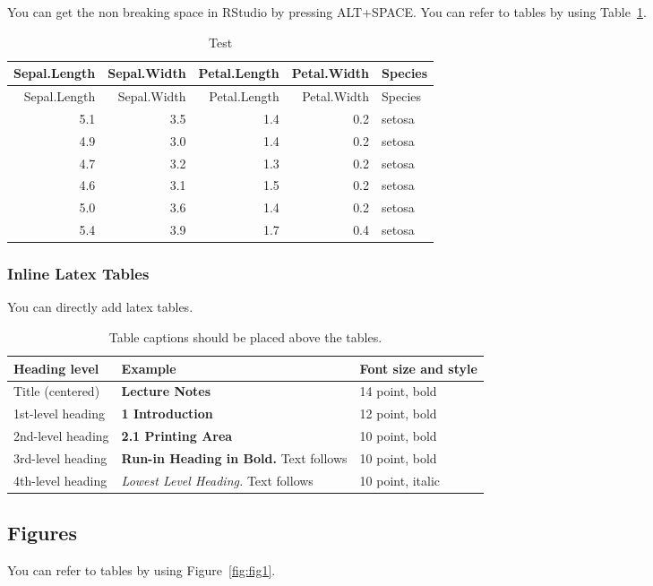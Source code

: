 \documentclass[runningheads]{llncs}
\begin{document}
You can get the non breaking space in RStudio by pressing ALT+SPACE. You
can refer to tables by using Table~\ref{tab:table_1}.

\begin{longtable}[]{@{}rrrrl@{}}
\caption{Test\label{tab:table_1}}\tabularnewline
\toprule
Sepal.Length & Sepal.Width & Petal.Length & Petal.Width &
Species\tabularnewline
\midrule
\endfirsthead
\toprule
Sepal.Length & Sepal.Width & Petal.Length & Petal.Width &
Species\tabularnewline
\midrule
\endhead
5.1 & 3.5 & 1.4 & 0.2 & setosa\tabularnewline
4.9 & 3.0 & 1.4 & 0.2 & setosa\tabularnewline
4.7 & 3.2 & 1.3 & 0.2 & setosa\tabularnewline
4.6 & 3.1 & 1.5 & 0.2 & setosa\tabularnewline
5.0 & 3.6 & 1.4 & 0.2 & setosa\tabularnewline
5.4 & 3.9 & 1.7 & 0.4 & setosa\tabularnewline
\bottomrule
\end{longtable}

\hypertarget{inline-latex-tables}{%
\subsubsection{Inline Latex Tables}\label{inline-latex-tables}}

You can directly add latex tables.

\begin{table}
\caption{Table captions should be placed above the
tables.}\label{tab1}
\begin{tabular}{|l|l|l|}
\hline
Heading level &  Example & Font size and style\\
\hline
Title (centered) &  {\Large\bfseries Lecture Notes} & 14 point, bold\\
1st-level heading &  {\large\bfseries 1 Introduction} & 12 point, bold\\
2nd-level heading & {\bfseries 2.1 Printing Area} & 10 point, bold\\
3rd-level heading & {\bfseries Run-in Heading in Bold.} Text follows & 10 point, bold\\
4th-level heading & {\itshape Lowest Level Heading.} Text follows & 10 point, italic\\
\hline
\end{tabular}
\end{table}

\hypertarget{figures}{%
\subsection{Figures}\label{figures}}

You can refer to tables by using Figure~\ref{fig:fig1}.
\end{document}
